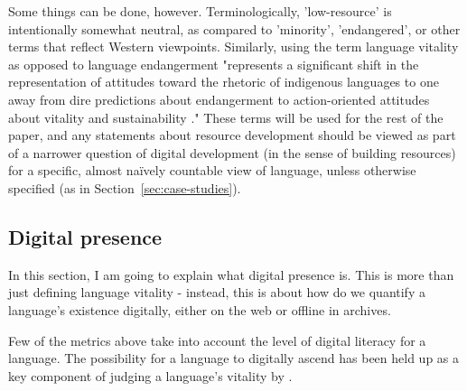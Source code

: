 Some things can be done, however. Terminologically, 'low-resource' is intentionally somewhat neutral, as compared to 'minority', 'endangered', or other terms that reflect Western viewpoints. Similarly, using the term language vitality as opposed to language endangerment "represents a significant shift in the representation of attitudes toward the rhetoric of indigenous languages to one away from dire predictions about endangerment to action-oriented attitudes about vitality and sustainability \citep{grenoble2016response}." These terms will be used for the rest of the paper, and any statements about resource development should be viewed as part of a narrower question of digital development (in the sense of building resources) for a specific, almost na\"ively countable view of language, unless otherwise specified (as in Section~\ref{sec:case-studies}).




\subsection{Digital presence}



In this section, I am going to explain what digital presence is. This is more than just defining language vitality - instead, this is about how do we quantify a language's existence digitally, either on the web or offline in archives.

Few of the metrics above take into account the level of digital literacy for a language. The possibility for a language to digitally ascend has been held up as a key component of judging a language's vitality by \citet{kornai2013digital}. %

